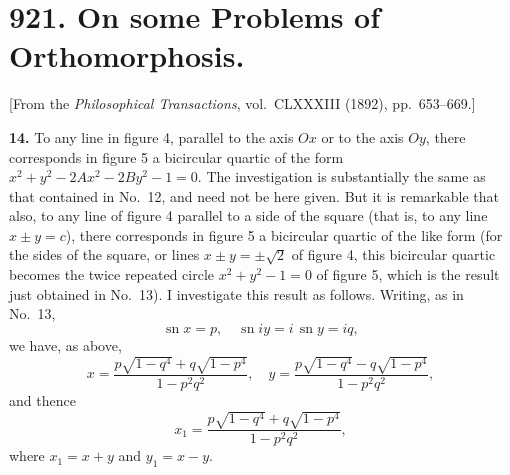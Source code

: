 \documentclass[11pt,a4paper]{book}
\begin{document}
\newpage



\section*{921. On some Problems of Orthomorphosis.}

[From the \textit{Philosophical Transactions}, vol.~CLXXXIII (1892), pp.~653--669.]

\bigskip

\textbf{14.} To any line in figure 4, parallel to the axis $Ox$ or to the axis $Oy$, there
corresponds in figure 5 a bicircular quartic of the form $x^2 + y^2 - 2Ax^2 - 2By^2 - 1 = 0$.
The investigation is substantially the same as that contained in No.~12, and need
not be here given. But it is remarkable that also, to any line of figure 4 parallel
to a side of the square (that is, to any line $x \pm y = c$), there corresponds in figure 5
a bicircular quartic of the like form (for the sides of the square, or lines $x \pm y = \pm \sqrt{2}$
of figure 4, this bicircular quartic becomes the twice repeated circle $x^2 + y^2 - 1 = 0$
of figure 5, which is the result just obtained in No.~13). I investigate this result
as follows. Writing, as in No.~13,
\[
\operatorname{sn} x = p, \quad \operatorname{sn} iy = i\, \operatorname{sn} y = iq,
\]
we have, as above,
\[
x = \frac{p\sqrt{1-q^4} + q\sqrt{1-p^4}}{1-p^2q^2},
\quad
y = \frac{p\sqrt{1-q^4} - q\sqrt{1-p^4}}{1-p^2q^2},
\]
and thence
\[
x_1 = \frac{p\sqrt{1-q^4} + q\sqrt{1-p^4}}{1-p^2q^2},
\]
where $x_1 = x + y$ and $y_1 = x - y$.
\end{document}
